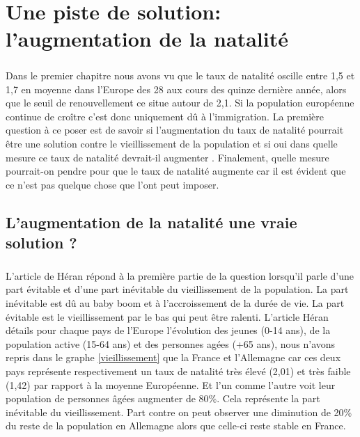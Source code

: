\chapter{Une piste de solution: l'augmentation de la natalité}
\paragraph{}Dans le premier chapitre nous avons vu que le taux de natalité oscille entre 1,5 et 1,7 en moyenne dans l’Europe des 28 aux cours des quinze dernière année, alors que le seuil de renouvellement ce situe autour de 2,1\citep{eur-lex}. Si la population européenne continue de croître c’est donc uniquement dû à l’immigration.  La première question à ce poser est de savoir si l’augmentation du taux de natalité pourrait être une solution contre le vieillissement de la population et si oui dans quelle mesure ce taux de natalité devrait-il augmenter . Finalement, quelle mesure pourrait-on pendre pour que le taux de natalité augmente car il est évident que ce n’est pas quelque chose que l’ont peut imposer. 
\section{L'augmentation de la natalité une vraie solution ?}
\paragraph{}L’article de Héran\citep[pp.1]{heran} répond à la première partie de la question lorsqu’il parle d’une part évitable et d’une part inévitable du vieillissement de la population. La part inévitable est dû au baby boom et à l’accroissement de la durée de vie. La part évitable est le vieillissement par le bas qui peut être ralenti. L’article Héran\citep[pp.5-6]{heran} détails pour chaque pays de l’Europe l’évolution des jeunes (0-14 ans), de la population active (15-64 ans) et des personnes agées (+65 ans), nous n’avons repris dans le graphe \ref{vieillissement} que la France et l’Allemagne car ces deux pays représente respectivement un taux de natalité très élevé (2,01) et très faible (1,42) par rapport à la moyenne Européenne.  Et l’un comme l’autre voit leur population de personnes âgées augmenter de 80\%. Cela représente la part inévitable du vieillissement. Part contre on peut observer une diminution de 20\% du reste de la population en Allemagne alors que celle-ci reste stable en France. 

